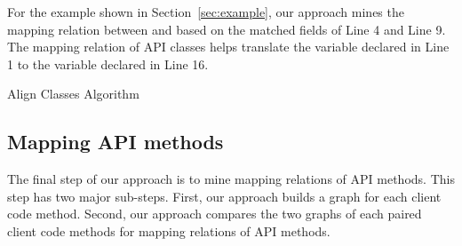 For the example shown in Section~\ref{sec:example}, our approach
mines the mapping relation between  and
 based on the matched fields of Line 4
and Line 9. The mapping relation of API classes helps translate the
variable declared in Line 1 to the variable declared in Line 16.


\begin{algorithm}[t]
\begin{SmallOut}

\dontprintsemicolon
 \end{SmallOut}

\label{alg:alignclasses} \caption{Align Classes Algorithm}
\end{algorithm}%
\subsection{Mapping API methods}
\label{sec:approach:mappingtypes} The final step of our approach is
to mine mapping relations of API methods. This step has two major
sub-steps. First, our approach builds a graph for each client code
method. Second, our approach compares the two graphs of each paired
client code methods for mapping relations of API methods.


